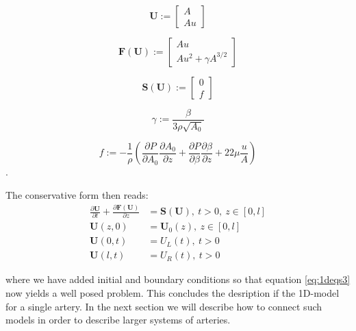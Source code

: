 \documentclass[a4paper, oneside]{discothesis}
\begin{document}
\begin{equation}
	\mathbf{U} := 
	\left[ 
		\begin{aligned}
			A \\
			Au
		\end{aligned}
	\right]
\end{equation}

\begin{equation}
	\mathbf{F} \left( \mathbf{U} \right) := 
	\left[ 
		\begin{aligned}
			Au \\
			Au^2 + \gamma A^{3/2}
		\end{aligned}
	\right]
\end{equation}

\begin{equation}
	\mathbf{S} \left( \mathbf{U} \right) := 
	\left[ 
		\begin{aligned}
			0 \\
			f
		\end{aligned}
	\right]
\end{equation}

\begin{equation}
	\gamma := \frac{\beta}{3\rho\sqrt{A_0}}
\end{equation}

\begin{equation}
	f := -\frac{1}{\rho} \left( \frac{\partial P}{\partial A_0} \frac{\partial A_0}{\partial z} + \frac{\partial P}{\partial \beta} \frac{\partial \beta}{\partial z} + 22\mu\frac{u}{A} \right)
\end{equation}.

The conservative form then reads:
\begin{equation}
	\begin{aligned}
		\frac{\partial \mathbf{U}}{\partial t} + \frac{\partial \mathbf{F} \left( \mathbf{U} \right)}{\partial z} &= \mathbf{S} \left( \mathbf{U} \right), \ t>0, \ z \in \left[ 0,l \right] \\
		\mathbf{U} \left( z,0 \right) &= \mathbf{U}_0 \left( z \right), \ z \in \left[ 0,l \right] \\
		\mathbf{U} \left( 0,t \right) &= U_L \left( t \right), \ t>0\\
		\mathbf{U} \left( l,t \right) &= U_R \left( t \right), \ t>0
	\end{aligned} \label{eq:1deqs3}
\end{equation}

where we have added initial and boundary conditions so that equation \ref{eq:1deqs3} now yields a well posed problem.
This concludes the desription if the 1D-model for a single artery.
In the next section we will describe how to connect such models in order to describe larger systems of arteries.
\end{document}
